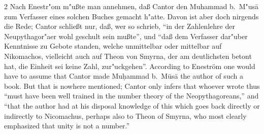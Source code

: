 \documentclass[10pt,a4paper]{article}
\renewcommand{\switchcolumn}{\syncronize\nointerlineskip\columnbreak}
\newcommand{\enquote}[1]{``#1''}
\begin{document}
\begin{paracol}{2}
Nach Enestr"om m"u\ss{}te man annehmen, da\ss{} Cantor den Muhammad b.\ M"us\=a zum Verfasser eines solchen Buches gemacht h"atte. Davon ist aber doch nirgends die Rede; Cantor schlie\ss{}t nur, da\ss{}, wer so schrieb, \enquote{in der Zahlenlehre der Neupythagor"aer wohl geschult sein mu\ss{}te}, und \enquote{da\ss{} dem Verfasser dar"uber Kenntnisse zu Gebote standen, welche unmittelbar oder mittelbar auf Nikomachos, vielleicht auch auf Theon von Smyrna, der am deutlichsten betont hat, die Einheit sei keine Zahl, zur"uckgehen}.
\switchcolumn
According to Enestr\"om one would have to assume that Cantor made Mu\d{h}ammad b.\ M\=us\=a the author of such a book. But that is nowhere mentioned; Cantor only infers that whoever wrote thus ``must have been well trained in the number theory of the Neopythagoreans,'' and ``that the author had at his disposal knowledge of this which goes back directly or indirectly to Nicomachus, perhaps also to Theon of Smyrna, who most clearly emphasized that unity is not a number.''
\end{paracol}
\end{document}
